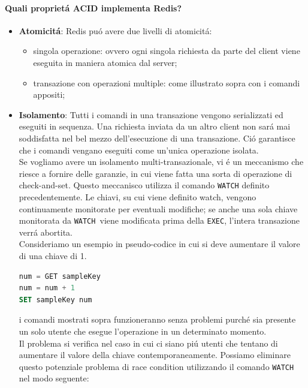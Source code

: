 \paragraph{Quali proprietá ACID implementa Redis?}
\begin{itemize}
    \item \textbf{Atomicitá}: Redis puó avere due livelli di atomicitá:
      \begin{itemize}
          \item singola operazione: ovvero ogni singola richiesta da parte del client viene eseguita in maniera atomica dal server;
          \item transazione con operazioni multiple: come illustrato sopra con i comandi appositi;
      \end{itemize}

    \item \textbf{Isolamento}:
    Tutti i comandi in una transazione vengono serializzati ed eseguiti in sequenza. Una richiesta inviata da un altro client
    non sará mai soddisfatta nel bel mezzo dell'esecuzione di una transazione. Ció garantisce che i comandi vengano eseguiti
    come un'unica operazione isolata.\\
    Se vogliamo avere un isolamento multi-transazionale, vi é un meccanismo che riesce a fornire delle garanzie, in cui viene fatta una sorta di operazione
    di check-and-set.
    Questo meccanisco utilizza il comando \texttt{WATCH} definito precedentemente.
    Le chiavi, su cui viene definito watch, vengono continuamente monitorate per eventuali modifiche; se anche una sola chiave monitorata
    da \texttt{WATCH }viene modificata prima della \texttt{EXEC}, l'intera transazione verrá abortita.\\

    Consideriamo un esempio in pseudo-codice in cui si deve aumentare il valore di una chiave di 1.

    \begin{lstlisting}[autogobble, style=redis-cli, language=SQL]
num = GET sampleKey
num = num + 1
SET sampleKey num\end{lstlisting}

    i comandi mostrati sopra funzioneranno senza problemi purché sia presente un solo utente che esegue l'operazione in un determinato momento.\\
    Il problema si verifica nel caso in cui ci siano piú utenti che tentano di aumentare il valore della chiave contemporaneamente.
    Possiamo eliminare questo potenziale problema di race condition utilizzando il comando \texttt{WATCH} nel modo seguente:


\end{itemize}
